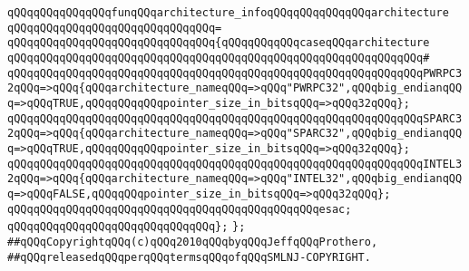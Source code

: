 \newline
\verb|qQQqqQQqqQQqqQQqfunqQQqarchitecture_infoqQQqqQQqqQQqqQQqarchitecture|\newline
\verb|qQQqqQQqqQQqqQQqqQQqqQQqqQQqqQQq=|\newline
\verb|qQQqqQQqqQQqqQQqqQQqqQQqqQQqqQQq{qQQqqQQqqQQqcaseqQQqarchitecture|\newline
\verb|qQQqqQQqqQQqqQQqqQQqqQQqqQQqqQQqqQQqqQQqqQQqqQQqqQQqqQQqqQQqqQQq#|\newline
\verb|qQQqqQQqqQQqqQQqqQQqqQQqqQQqqQQqqQQqqQQqqQQqqQQqqQQqqQQqqQQqqQQqPWRPC32qQQq=>qQQq{qQQqarchitecture_nameqQQq=>qQQq"PWRPC32",qQQqbig_endianqQQq=>qQQqTRUE,qQQqqQQqqQQqpointer_size_in_bitsqQQq=>qQQq32qQQq};|\newline
\verb|qQQqqQQqqQQqqQQqqQQqqQQqqQQqqQQqqQQqqQQqqQQqqQQqqQQqqQQqqQQqqQQqSPARC32qQQq=>qQQq{qQQqarchitecture_nameqQQq=>qQQq"SPARC32",qQQqbig_endianqQQq=>qQQqTRUE,qQQqqQQqqQQqpointer_size_in_bitsqQQq=>qQQq32qQQq};|\newline
\verb|qQQqqQQqqQQqqQQqqQQqqQQqqQQqqQQqqQQqqQQqqQQqqQQqqQQqqQQqqQQqqQQqINTEL32qQQq=>qQQq{qQQqarchitecture_nameqQQq=>qQQq"INTEL32",qQQqbig_endianqQQq=>qQQqFALSE,qQQqqQQqpointer_size_in_bitsqQQq=>qQQq32qQQq};|\newline
\verb|qQQqqQQqqQQqqQQqqQQqqQQqqQQqqQQqqQQqqQQqqQQqqQQqesac;|\newline
\verb|qQQqqQQqqQQqqQQqqQQqqQQqqQQqqQQq};|\newline
\verb|};|\newline
\newline
\newline
\verb|##qQQqCopyrightqQQq(c)qQQq2010qQQqbyqQQqJeffqQQqProthero,|\newline
\verb|##qQQqreleasedqQQqperqQQqtermsqQQqofqQQqSMLNJ-COPYRIGHT.|\newline

